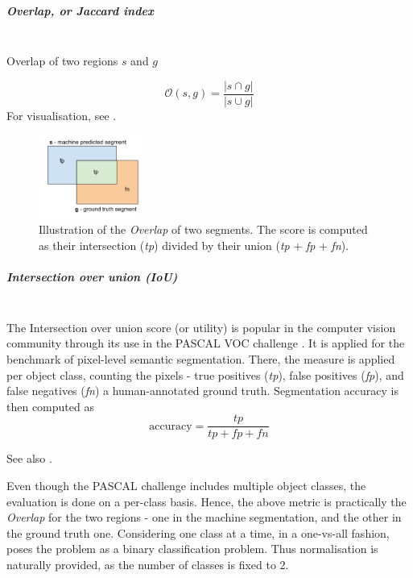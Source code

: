 \subparagraph{Overlap, or Jaccard index}\mbox{}\\
Overlap of two regions %
$s$ and $g$

\begin{equation}
\mathcal{O}\left(s,g\right)=\frac{\left|s\cap g\right|}{\left|s\cup g\right|}
\end{equation}
For visualisation, see .

\begin{figure}[t]
\centering
\includegraphics[width=0.3\textwidth]{images/scoring_fcns/intersection-over-union_score_illustrated.png}
\caption[Illustration of the \textit{Overlap} of two segments]{Illustration of the \textit{Overlap} of two segments. The score is computed as their intersection (\textit{tp}) divided by their union (\textit{tp} + \textit{fp} + \textit{fn}).}
\label{fig:overlap-IoU}
\end{figure}

\subparagraph{Intersection over union (IoU)}\mbox{}\\
The Intersection over union score (or utility) %
is popular in the computer vision community through its use in the PASCAL VOC challenge \cite{PASCAL-voc-2012}. It is applied for the benchmark of pixel-level semantic segmentation. There, the measure is applied per object class, counting the pixels - true positives (\textit{tp}), false positives (\textit{fp}), and false negatives (\textit{fn}) \wrt a human-annotated ground truth. Segmentation accuracy is then computed as
\begin{equation}
 \text{accuracy} = \frac{\textit{tp}}{\textit{tp} + \textit{fp} + \textit{fn}}
\end{equation}

See also .

Even though the PASCAL challenge includes multiple object classes, the evaluation is done on a per-class basis. Hence, the above metric is practically the {\it Overlap} for the two regions - one in the machine segmentation, and the other in the ground truth one. 
Considering one class at a time, in a one-vs-all fashion, poses the problem as a binary classification problem. Thus normalisation is naturally provided, as the number of classes is fixed to 2.

